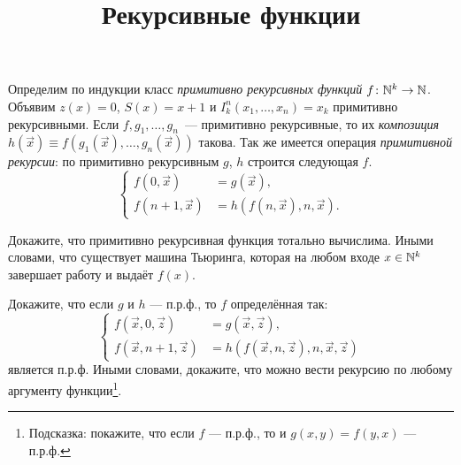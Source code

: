 \documentclass[a4paper, 12pt, num=Г1]{listok}
\begin{document}
\title{Рекурсивные функции}
\maketitle
\begin{definition}
	Определим по индукции класс \textit{примитивно рекурсивных функций $f \colon \mathbb{N}^k \to \mathbb{N}$}.
	Объявим $z(x) = 0$, $S(x) = x + 1$ и $I_k^n(x_1, \dots, x_n) = x_k$ примитивно рекурсивными.
	Если $f, g_1, \dots, g_n$~--- примитивно рекурсивные,
	то их \textit{композиция} $h(\vec x) \equiv f(g_1(\vec x), \dots, g_n(\vec x))$ такова.
	Так же имеется операция \textit{примитивной рекурсии}: по примитивно рекурсивным $g$, $h$ строится следующая $f$.
	\[
		\left \{
			\begin{aligned}
				f(0, \vec x) & = g(\vec x),\\
				f(n + 1, \vec x) & = h(f(n, \vec x), n, \vec x).
			\end{aligned}
		\right .
	\]
\end{definition}
\begin{problem}
	Докажите, что примитивно рекурсивная функция тотально вычислима.
	Иными словами, что существует машина Тьюринга, которая на любом входе $x \in \mathbb{N}^k$ завершает работу и выдаёт $f(x)$.
\end{problem}
\begin{problem}
	Докажите, что если $g$ и $h$ --- п.р.ф., то $f$ определённая так:
	\[
		\left \{
			\begin{aligned}
				f(\vec x, 0, \vec z) & = g(\vec x, \vec z),\\
				f(\vec x, n + 1, \vec z) & = h(f(\vec x, n, \vec z), n, \vec x, \vec z)
			\end{aligned}
		\right .
	\]
	является п.р.ф.
	Иными словами, докажите, что можно вести рекурсию по любому аргументу функции\footnote{Подсказка: покажите, что если $f$ --- п.р.ф.,
	то и $g(x, y) = f(y, x)$ --- п.р.ф.}.
\end{problem}
\end{document}
